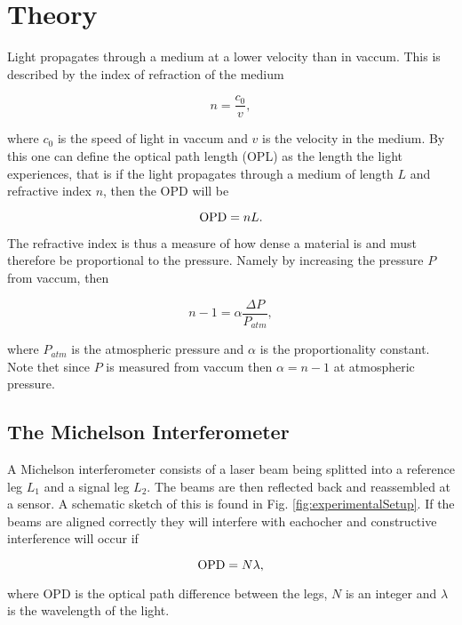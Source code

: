 \section{Theory}

Light propagates through a medium at a lower velocity than in vaccum. This is described by the index of refraction of the medium

\begin{equation}
  \label{eq:refrInd}
  n = \frac{c_0}{v},
\end{equation}

where $c_0$ is the speed of light in vaccum and $v$ is the velocity in the medium\cite{phH}. By this one can define the optical path length (OPL) as the length the light experiences, that is if the light propagates through a medium of length $L$ and refractive index $n$, then the OPD will be

\begin{equation*}
  \textnormal{OPD} = nL.
\end{equation*}

The refractive index is thus a measure of how dense a material is and must therefore be proportional to the pressure. Namely by increasing the pressure $P$ from vaccum, then

\begin{equation}
  \label{eq:refrVaccum}
  n-1 = \alpha \frac{\Delta P}{P_{atm}},
\end{equation}

where $P_{atm}$ is the atmospheric pressure and $\alpha$ is the proportionality constant. Note thet since $P$ is measured from vaccum then $\alpha=n-1$ at atmospheric pressure.

\subsection{The Michelson Interferometer}
A Michelson interferometer consists of a laser beam being splitted into a reference leg $L_1$ and a signal leg $L_2$. The beams are then reflected back and reassembled at a sensor. A schematic sketch of this is found in Fig. \ref{fig:experimentalSetup}. If the beams are aligned correctly they will interfere with eachocher and constructive interference will occur if

\begin{equation}
\label{eq:interference}
  \textnormal{OPD} = N \lambda,
\end{equation}

where OPD is the optical path difference between the legs, $N$ is an integer and $\lambda$ is the wavelength of the light.

